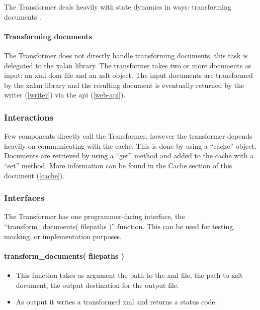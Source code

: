 The Transformer deals heavily with state dynamics in ways: transforming documents .

\paragraph{Transforming documents}

The Transformer does not directly handle transforming documents, this task is delegated to the \gls{xalan} library. \cite{xalan-library}
The transformer takes two or more documents as input: an \gls{xml} \gls{dom} file and an \gls{xslt} object.
The input documents are transformed by the \gls{xalan} library and the resulting document is eventually returned by the writer (\ref{writer}) via the \gls{api} (\ref{web-api}).

\subsubsection{Interactions}

Few components directly call the Transformer, however the transformer depends heavily on communicating with the cache.
This is done by using a ``cache'' object.
Documents are retrieved by using a ``get'' method and added to the cache with a ``set'' method.
More information can be found in the Cache section of this document (\ref{cache}).

\subsubsection{Interfaces}

The Transformer has one programmer-facing interface, the ``transform\_documents( filepaths )'' function.
This can be used for testing, mocking, or implementation purposes.

\paragraph{transform\_documents( filepaths )}

\begin{itemize}
  \item This function takes as argument the path to the \gls{xml} file, the path to \gls{xslt} document, the output destination for the output file.
  \item As output it writes a transformed \gls{xml} and returns a status code.
\end{itemize}

